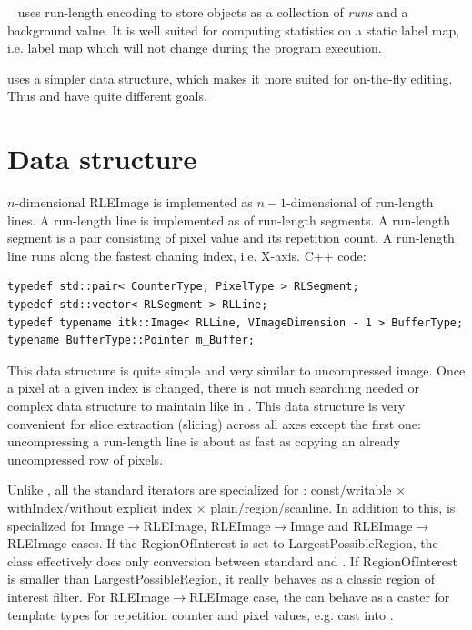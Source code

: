 \documentclass{InsightArticle}
\begin{document}
~\cite{Lehmann2007} uses run-length encoding to store objects
as a collection of \textit{runs} and a background value.
It is well suited for computing statistics on a static label map,
i.e. label map which will not change during the program execution.

 uses a simpler data structure, which makes it more suited
for on-the-fly editing.
Thus  and  have quite different goals.


\section{Data structure}

$n$-dimensional RLEImage is implemented as $n-1$-dimensional  of run-length lines.
A run-length line is implemented as  of run-length segments.
A run-length segment is a pair consisting of pixel value and its repetition count.
A run-length line runs along the fastest chaning index, i.e. X-axis. C++ code:

\begin{verbatim}
typedef std::pair< CounterType, PixelType > RLSegment;
typedef std::vector< RLSegment > RLLine;
typedef typename itk::Image< RLLine, VImageDimension - 1 > BufferType;
typename BufferType::Pointer m_Buffer;
\end{verbatim}

This data structure is quite simple and very similar to uncompressed image.
Once a pixel at a given index is changed, there is not much searching needed
or complex data structure to maintain like in .
This data structure is very convenient for slice extraction (slicing)
across all axes except the first one: uncompressing a run-length line
is about as fast as copying an already uncompressed row of pixels.

Unlike , all the standard iterators are specialized for :
const/\-writable $\times$ withIndex/\-without explicit index $\times$ plain/\-region/\-scanline.
In addition to this,  is specialized for
Image$\rightarrow$RLEImage, RLEImage$\rightarrow$Image and RLEImage$\rightarrow$RLEImage cases.
If the RegionOfInterest is set to LargestPossibleRegion, the class effectively
does only conversion between standard  and .
If RegionOfInterest is smaller than LargestPossibleRegion,
it really behaves as a classic region of interest filter.
For RLEImage$\rightarrow$RLEImage case, the 
can behave as a caster for template types for repetition counter and pixel values,
e.g. cast  into .
\end{document}
